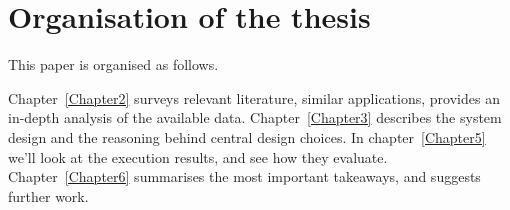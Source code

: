 \section{Organisation of the thesis}
\label{sec:thesis_organisation}

This paper is organised as follows.

Chapter~\ref{Chapter2} surveys relevant literature, similar applications, provides an in-depth analysis of the available data.
Chapter~\ref{Chapter3} describes the system design and the reasoning behind central design choices.
In chapter~\ref{Chapter5} we'll look at the execution results, and see how they evaluate.
Chapter~\ref{Chapter6} summarises the most important takeaways, and suggests further work.

